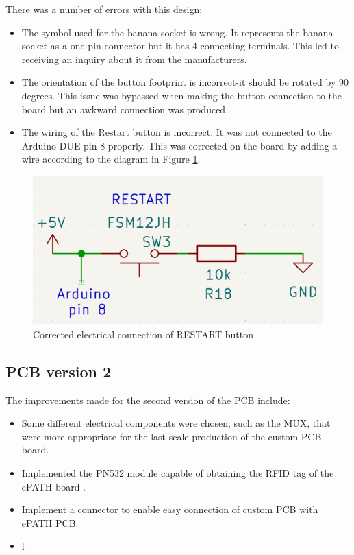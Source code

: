 There was a number of errors with this design:
\begin{itemize}
\item The symbol used for the banana socket is wrong. It represents the banana socket as a one-pin connector but it has 4 connecting terminals. This led to receiving an inquiry about it from the manufacturers.
\item The orientation of the button footprint is incorrect-it should be rotated by 90 degrees. This issue was bypassed when making the button connection to the board but an awkward connection was produced.
\item The wiring of the Restart button is incorrect. It was not connected to the Arduino DUE pin 8 properly. This was corrected on the board by adding a wire according to the diagram in Figure \ref{button_wiring}.
\end{itemize}

\begin{figure}[H]
          \centering
          \includegraphics[width=1\linewidth]{img/button_wiring.png}
          \caption{Corrected electrical connection of RESTART button}
          \label{button_wiring}
    \end{figure}



\subsection{PCB version 2}
The improvements made for the second version of the PCB include:
\begin{itemize}
\item Some different electrical components were chosen, such as the MUX, that were more appropriate for the last scale production of the custom PCB board.
\item Implemented the PN532 module capable of obtaining the RFID tag of the ePATH board \cite{pn532manual}.
\item Implement a connector to enable easy connection of custom PCB with ePATH PCB.
\item l
\end{itemize}




